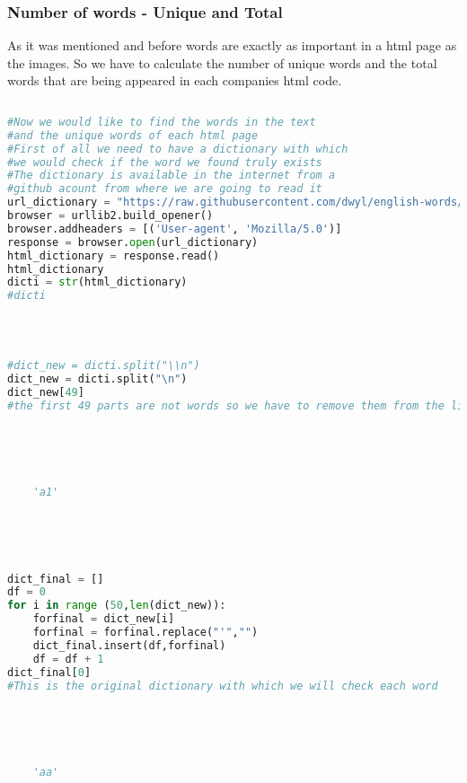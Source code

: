 \documentclass{article}
\begin{document}
\subsubsection{Number of words - Unique and Total}
As it was mentioned and before words are exactly as important in a html page as the images. So we have to calculate the number of unique words and the total words that are being appeared in each companies html code.
\begin{lstlisting}[language=Python]
 
#Now we would like to find the words in the text 
#and the unique words of each html page
#First of all we need to have a dictionary with which 
#we would check if the word we found truly exists
#The dictionary is available in the internet from a 
#github acount from where we are going to read it
url_dictionary = "https://raw.githubusercontent.com/dwyl/english-words/master/words.txt"
browser = urllib2.build_opener()
browser.addheaders = [('User-agent', 'Mozilla/5.0')]
response = browser.open(url_dictionary)
html_dictionary = response.read()
html_dictionary
dicti = str(html_dictionary)
#dicti
 


 
#dict_new = dicti.split("\\n")
dict_new = dicti.split("\n")
dict_new[49] 
#the first 49 parts are not words so we have to remove them from the list
 




    'a1'




 
dict_final = []
df = 0
for i in range (50,len(dict_new)):
    forfinal = dict_new[i]
    forfinal = forfinal.replace("'","")
    dict_final.insert(df,forfinal)
    df = df + 1
dict_final[0] 
#This is the original dictionary with which we will check each word
 




    'aa'





\end{lstlisting}
\end{document}
